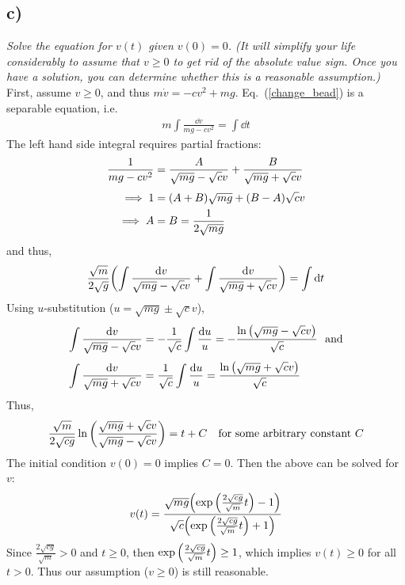 \documentclass[12pt]{article}
\begin{document}
\subsection*{ c)}
{\it Solve the equation for $v(t)$ given $v(0) = 0$.  (It will simplify your life considerably to assume that $v \geq 0$ to get rid of the absolute value sign.  Once you have a solution, you can determine whether this is a reasonable assumption.)} \\

First, assume $v \geq 0$, and thus $m\dot{v} = -cv^2 + mg$.  Eq.~(\ref{change_bead}) is a separable equation, i.e.
\begin{align*}
	m\int \frac{\dd v}{mg - cv^2} = \int \dd t
\end{align*}
The left hand side integral requires partial fractions:
\begin{align*}
	\frac{1}{mg - cv^2} &= \frac{A}{\sqrt{mg} - \sqrt{c}v} + \frac{B}{\sqrt{mg} + \sqrt{c}v} \\[.1cm]
	\implies 1 &= \qty(A + B)\sqrt{mg} + \qty(B - A)\sqrt{c}v \\
	\implies A &= B = \frac{1}{2\sqrt{mg}}
\end{align*}
and thus,
\begin{align*}
	\frac{\sqrt{m}}{2\sqrt{g}}\qty(\int \frac{\dd v}{\sqrt{mg} - \sqrt{c}v} + \int \frac{\dd v}{\sqrt{mg} + \sqrt{c}v}) = \int \dd t
\end{align*}
Using $u$-substitution ($u = \sqrt{mg} \pm \sqrt{c}v$),
\begin{align*}
	\int \frac{\dd v}{\sqrt{mg} - \sqrt{c}v} &= -\frac{1}{\sqrt{c}}\int\frac{\dd u}{u} = -\frac{\ln\qty(\sqrt{mg} - \sqrt{c}v)}{\sqrt{c}}\ \ \text{and} \\[.1cm]
	\int \frac{\dd v}{\sqrt{mg} + \sqrt{c}v} &= \frac{1}{\sqrt{c}}\int\frac{\dd u}{u} = \frac{\ln\qty(\sqrt{mg} + \sqrt{c}v)}{\sqrt{c}}
\end{align*}
Thus,
\begin{align*}
	\frac{\sqrt{m}}{2\sqrt{cg}}\ln\qty(\frac{\sqrt{mg} + \sqrt{c}v}{\sqrt{mg} - \sqrt{c}v}) = t + C\ \ \ \text{for some arbitrary constant $C$}
\end{align*}
The initial condition $v(0) = 0$ implies $C = 0$.  Then the above can be solved for $v$:
\begin{equation}
	\label{bead_solution}
	v(t) = \frac{\sqrt{mg}\qty(\exp\qty(\frac{2\sqrt{cg}}{\sqrt{m}}t) - 1)}{\sqrt{c}\qty(\exp\qty(\frac{2\sqrt{cg}}{\sqrt{m}}t) + 1)}
\end{equation}
Since $\frac{2\sqrt{cg}}{\sqrt{m}} > 0$ and $t \geq 0$, then $\exp\qty(\frac{2\sqrt{cg}}{\sqrt{m}}t) \geq 1$, which implies $v(t) \geq 0$ for all $t > 0$.  Thus our assumption ($v \geq 0$) is still reasonable.
\end{document}
